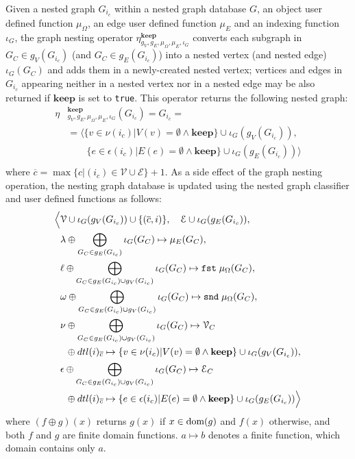\begin{definition}
	Given a nested graph $G_{i_c}$ within a nested graph database $G$, an object user defined function $\mu_\Omega$, an edge user defined function $\mu_E$ and an indexing function $\iota_G$, the graph nesting operator $\eta_{g_V,g_E,\mu_\Omega,\mu_E,\iota_G}^{\textbf{keep}}$ converts each subgraph in $G_C\in g_V(G_{i_c})$ (and $G_C\in g_E(G_{i_c})$) into a nested vertex (and nested edge) $\iota_G(G_C)$ and adds them in a newly-created nested vertex; vertices and edges in $G_{i_c}$ appearing neither in a nested vertex nor in a nested edge may be also returned if $\textbf{keep}$ is set to \texttt{true}. This operator returns the following nested graph:
	\[\begin{split}
	\eta&{}_{g_V,g_E,\mu_\Omega,\mu_E,\iota_G}^{\textbf{keep}}(G_{i_c})=G_{i_{\overline{c}}}=\\
	&=\Big\langle \{v\in \nu(i_c) | V(v)=\emptyset\wedge\textbf{keep} \}\cup \iota_G(g_V(G_{i_c})),\\
	&\qquad \{e\in \epsilon(i_c) | E(e)=\emptyset\wedge\textbf{keep} \}\cup \iota_G(g_E(G_{i_c}))\Big\rangle\\
	\end{split}\]
	where $\overline{c}=\max\{c|(i_c)\in\mathcal{V}\cup\mathcal{E}\}+1$. As a side effect of the graph nesting operation, the nesting graph database is updated using the nested graph classifier and user defined functions as follows:
	\begin{align*}
	\Big\langle&\mathcal{V}\cup \iota_G(g_V(G_{i_c}))\cup\{(\overline{c},i)\},\quad \mathcal{E}\cup \iota_G(g_E(G_{i_c})),\\
	& \lambda\oplus \bigoplus_{G_C\in g_E(G_{i_c})}\iota_G(G_C)\mapsto \mu_E(G_C),\\
	& \ell\oplus\bigoplus_{G_C\in g_E(G_{i_c})\cup g_V(G_{i_c})}\iota_G(G_C)\mapsto\texttt{fst}\;\mu_\Omega(G_C),\\
	& \omega\oplus\bigoplus_{G_C\in g_E(G_{i_c})\cup g_V(G_{i_c})}\iota_G(G_C)\mapsto\texttt{snd}\;\mu_\Omega(G_C),\\
	& \nu\oplus \bigoplus_{G_C\in g_E(G_{i_c})\cup g_V(G_{i_c})}\iota_G(G_C)\mapsto \mathcal{V}_C\\
	& \;\; \oplus dtl(i)_{\overline{c}}\mapsto \{v\in \nu(i_c) | V(v)=\emptyset\wedge\textbf{keep} \}\cup \iota_G(g_V(G_{i_c})),\\
	& \epsilon\oplus \bigoplus_{G_C\in g_E(G_{i_c})\cup g_V(G_{i_c})}\iota_G(G_C)\mapsto \mathcal{E}_C\\
	& \;\; \oplus dtl(i)_{\overline{c}}\mapsto\{e\in \epsilon(i_c) | E(e)=\emptyset\wedge\textbf{keep} \}\cup \iota_G(g_E(G_{i_c}))\Big\rangle\\
	\end{align*}
	where $(f\oplus g)(x)$ returns $g(x)$ if $x\in\textup{dom}(g)$ and $f(x)$ otherwise, and both $f$ and $g$ are finite domain functions. $a\mapsto b$ denotes a finite function, which domain contains only $a$.
\end{definition}

